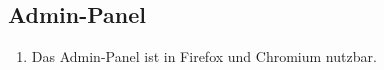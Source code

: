 \subsection{Admin-Panel}

\begin{enumerate}
    \item Das Admin-Panel ist in Firefox und Chromium nutzbar.
\end{enumerate}